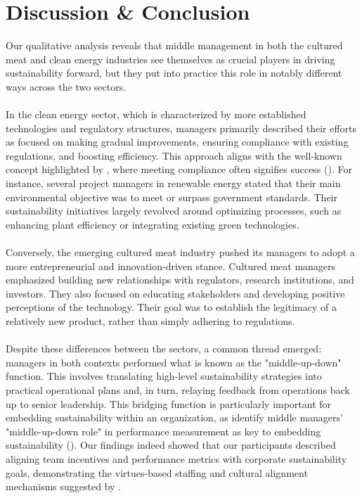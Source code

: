 
	
	\section{Discussion \& Conclusion}
	
	Our qualitative analysis reveals that middle management in both the cultured meat and clean energy industries see themselves as crucial players in driving sustainability forward, but they put into practice this role in notably different ways across the two sectors.
	
	\paragraph*{} In the clean energy sector, which is characterized by more established technologies and regulatory structures, managers primarily described their efforts as focused on making gradual improvements, ensuring compliance with existing regulations, and boosting efficiency. This approach aligns with the well-known concept highlighted by \citeauthor{Fischhoff2024}, where meeting compliance often signifies success (\textcite{Fischhoff2024}). For instance, several project managers in renewable energy stated that their main environmental objective was to meet or surpass government standards. Their sustainability initiatives largely revolved around optimizing processes, such as enhancing plant efficiency or integrating existing green technologies.
	
	\paragraph*{} Conversely, the emerging cultured meat industry pushed its managers to adopt a more entrepreneurial and innovation-driven stance. Cultured meat managers emphasized building new relationships with regulators, research institutions, and investors. They also focused on educating stakeholders and developing positive perceptions of the technology. Their goal was to establish the legitimacy of a relatively new product, rather than simply adhering to regulations.
	
	\paragraph*{} Despite these differences between the sectors, a common thread emerged: managers in both contexts performed what is known as the "middle-up-down" function. This involves translating high-level sustainability strategies into practical operational plans and, in turn, relaying feedback from operations back up to senior leadership. This bridging function is particularly important for embedding sustainability within an organization, as \citeauthor{Posch2017} identify middle managers' "middle-up-down role" in performance measurement as key to embedding sustainability (\textcite{Posch2017}). Our findings indeed showed that our participants described aligning team incentives and performance metrics with corporate sustainability goals, demonstrating the virtues-based staffing and cultural alignment mechanisms suggested by \citeauthor{Posch2017}.
	
